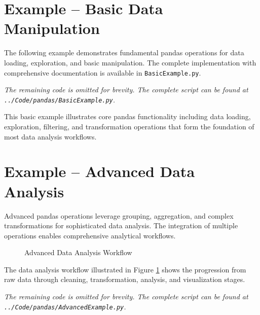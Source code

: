 \section{Example -- Basic Data Manipulation}
\label{sec:basic_example}

The following example demonstrates fundamental pandas operations for data loading, exploration, and basic manipulation. The complete implementation with comprehensive documentation is available in \texttt{BasicExample.py}.



\noindent\textit{The remaining code is omitted for brevity. The complete script can be found at \texttt{../Code/pandas/BasicExample.py}.}

This basic example illustrates core pandas functionality including data loading, exploration, filtering, and transformation operations that form the foundation of most data analysis workflows.

\section{Example -- Advanced Data Analysis}
\label{sec:advanced_example}

Advanced pandas operations leverage grouping, aggregation, and complex transformations for sophisticated data analysis. The integration of multiple operations enables comprehensive analytical workflows.

\clearpage

\begin{figure}[htbp]
	\centering
    
	\caption{Advanced Data Analysis Workflow}
	\label{fig:data_workflow}
\end{figure}

The data analysis workflow illustrated in Figure \ref{fig:data_workflow} shows the progression from raw data through cleaning, transformation, analysis, and visualization stages.



\noindent\textit{The remaining code is omitted for brevity. The complete script can be found at \texttt{../Code/pandas/AdvancedExample.py}.}

